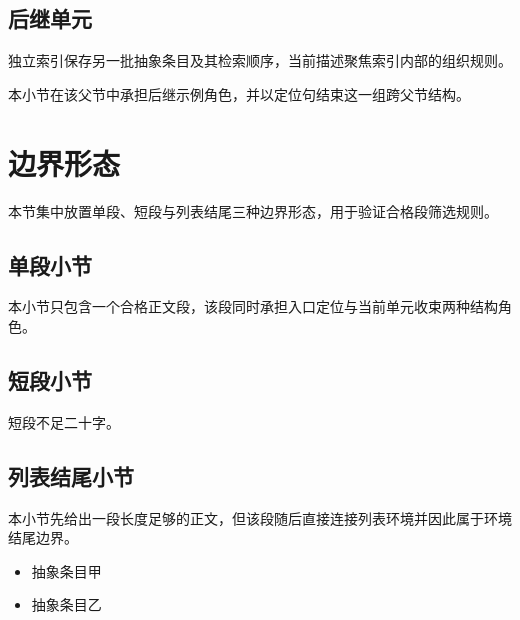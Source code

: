\subsection{后继单元}
独立索引保存另一批抽象条目及其检索顺序，当前描述聚焦索引内部的组织规则。

本小节在该父节中承担后继示例角色，并以定位句结束这一组跨父节结构。

\section{边界形态}
本节集中放置单段、短段与列表结尾三种边界形态，用于验证合格段筛选规则。

\subsection{单段小节}
本小节只包含一个合格正文段，该段同时承担入口定位与当前单元收束两种结构角色。

\subsection{短段小节}
短段不足二十字。

\subsection{列表结尾小节}
本小节先给出一段长度足够的正文，但该段随后直接连接列表环境并因此属于环境结尾边界。
\begin{itemize}
  \item 抽象条目甲
  \item 抽象条目乙
\end{itemize}
